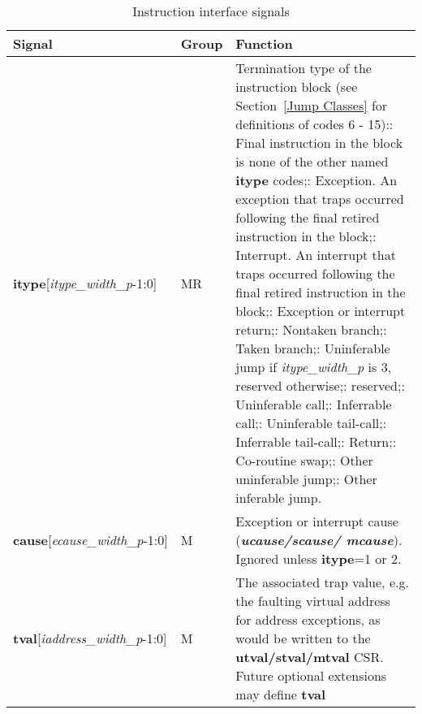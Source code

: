 \begin{table}[htp]
    \centering
    \caption{Instruction interface signals}
    \label{tab:common-ingress}
    \begin{tabulary}{\textwidth}{|l|l|p{80mm}|}
        \hline
        \textbf{Signal} & \textbf{Group} & \textbf{Function} \\
        \hline
        \textbf{itype}[\textit{itype\_width\_p}-1:0] & MR & Termination type of the instruction block (see Section~\ref{Jump Classes} for definitions of codes 6 - 15):: Final instruction in the block is none of the other named \textbf{itype} codes;: Exception. An exception that traps occurred following the final retired instruction in the block;: Interrupt. An interrupt that traps occurred following the final retired instruction in the block;: Exception or interrupt return;: Nontaken branch;: Taken branch;: Uninferable jump if \textit{itype\_width\_p} is 3, reserved otherwise;: reserved;: Uninferable call;: Inferrable call;: Uninferable tail-call;: Inferrable tail-call;: Return;: Co-routine swap;: Other uninferable jump;: Other inferable jump.\\
        \hline
        \textbf{cause}[\textit{ecause\_width\_p}-1:0] & M & Exception or interrupt cause (\textbf{\textit{ucause/scause/ mcause}}).
        Ignored unless \textbf {itype}=1 or 2.\\
        \hline
        \textbf{tval}[\textit{iaddress\_width\_p}-1:0] & M & The associated trap value, e.g. the
        faulting virtual address for address exceptions, as would be
        written to the \textbf{utval/stval/mtval} CSR. Future optional extensions may define \textbf{tval} 

\end{tabulary}
\end{table}

